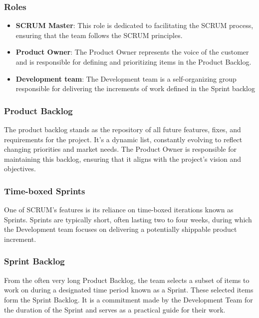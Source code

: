 \subsubsection*{Roles}

\begin{itemize}
    \item \textbf{SCRUM Master}: This role is dedicated to facilitating the SCRUM process, 
        ensuring that the team follows the SCRUM principles.
    \item \textbf{Product Owner}: The Product Owner represents the voice of the 
        customer and is responsible for defining and prioritizing items in the Product Backlog.
    \item \textbf{Development team}: The Development team is a self-organizing 
        group responsible for delivering the increments of work defined in the Sprint backlog
\end{itemize}

\subsubsection*{Product Backlog}

The product backlog stands as the repository of all future features, 
fixes, and requirements for the project. 
It's a dynamic list, constantly evolving to reflect changing priorities and market needs. 
The Product Owner is responsible for maintaining this backlog, 
ensuring that it aligns with the project's vision and objectives.

\subsubsection*{Time-boxed Sprints}
One of SCRUM's features is its reliance on time-boxed iterations known as Sprints.
Sprints are typically short, often lasting two to four weeks, 
during which the Development team focuses on delivering a 
potentially shippable product increment.

\subsubsection*{Sprint Backlog}

From the often very long Product Backlog, the team selects a subset of items 
to work on during a designated time period known as a Sprint.
These selected items form the Sprint Backlog. 
It is a commitment made by the Development Team for the duration of 
the Sprint and serves as a practical guide for their work.

